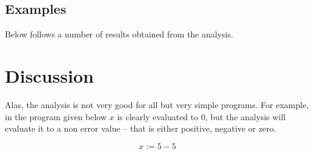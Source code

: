 \documentclass[11pt,oneside,a4paper]{article}
\begin{document}
  \subsection*{Examples}
    Below follows a number of results obtained from the analysis.

\section*{Discussion}
  Alas, the analysis is not very good for all but very simple programs. For
  example, in the program given below $x$ is clearly evaluated to $0$, but the
  analysis will evaluate it to a non error value -- that is either positive,
  negative or zero.

  \[
    x := 5-5
  \]
\end{document}
